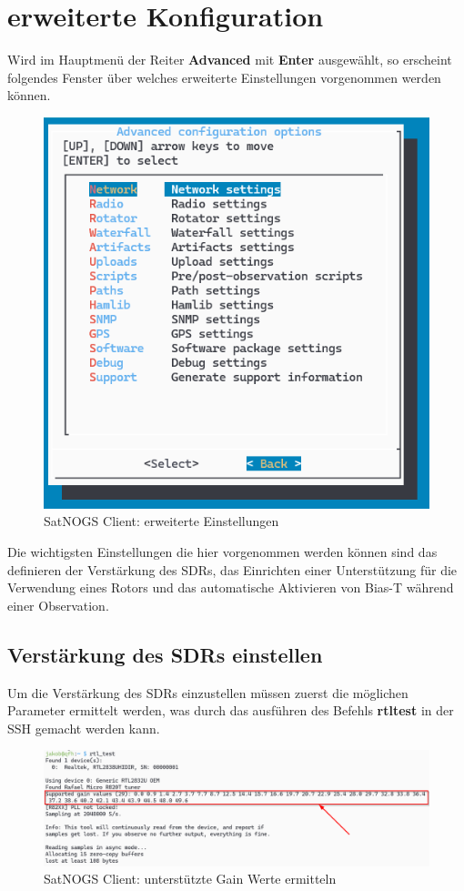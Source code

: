 \section{erweiterte Konfiguration} 
Wird im Hauptmenü der Reiter \textbf{Advanced} mit \textbf{Enter} ausgewählt, so erscheint folgendes Fenster über welches erweiterte Einstellungen vorgenommen werden können. 

\begin{figure} [H]
	\centering
	\includegraphics[width=.5\linewidth]{../ref/advanced_settings.png}
	\caption{SatNOGS Client: erweiterte Einstellungen}
	\label{fig:advanced_settings}
\end{figure}

Die wichtigsten Einstellungen die hier vorgenommen werden können sind das definieren der Verstärkung des SDRs, das Einrichten einer Unterstützung für die Verwendung eines Rotors und das automatische Aktivieren von Bias-T während einer Observation.

\subsection{Verstärkung des SDRs einstellen}
Um die Verstärkung des SDRs einzustellen müssen zuerst die möglichen Parameter ermittelt werden, was durch das ausführen des Befehls \textbf{rtl\textunderscore test} in der SSH gemacht werden kann. 

\begin{figure} [H]
	\centering
	\includegraphics[width=\linewidth]{../ref/supportedgain.png}
	\caption{SatNOGS Client: unterstützte Gain Werte ermitteln}
	\label{fig:supportedgain}
\end{figure}

